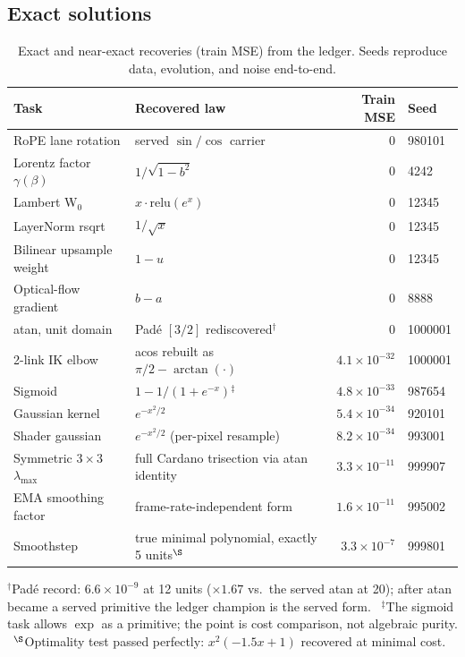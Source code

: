 \documentclass[11pt]{article}
\begin{document}
\subsection{Exact solutions}
\begin{table}[h]
\centering
\caption{Exact and near-exact recoveries (train MSE) from the ledger. Seeds reproduce data, evolution, and noise end-to-end.}
\label{tab:exact}
\small
\begin{tabular}{@{}llrl@{}}
\toprule
Task & Recovered law & Train MSE & Seed \\
\midrule
RoPE lane rotation & served $\sin/\cos$ carrier & $0$ & 980101 \\
Lorentz factor $\gamma(\beta)$ & $1/\sqrt{1-b^2}$ & $0$ & 4242 \\
Lambert W$_0$ & $x\cdot\mathrm{relu}(e^x)$ & $0$ & 12345 \\
LayerNorm rsqrt & $1/\sqrt{x}$ & $0$ & 12345 \\
Bilinear upsample weight & $1-u$ & $0$ & 12345 \\
Optical-flow gradient & $b-a$ & $0$ & 8888 \\
atan, unit domain & Pad\'e $[3/2]$ rediscovered$^{\dagger}$ & $0$ & 1000001 \\
2-link IK elbow & acos rebuilt as $\pi/2-\arctan(\cdot)$ & $4.1\times10^{-32}$ & 1000001 \\
Sigmoid & $1 - 1/(1+e^{-x})$$^{\ddagger}$ & $4.8\times10^{-33}$ & 987654 \\
Gaussian kernel & $e^{-x^2/2}$ & $5.4\times10^{-34}$ & 920101 \\
Shader gaussian & $e^{-x^2/2}$ (per-pixel resample) & $8.2\times10^{-34}$ & 993001 \\
Symmetric $3{\times}3$ $\lambda_{\max}$ & full Cardano trisection via atan identity & $3.3\times10^{-11}$ & 999907 \\
EMA smoothing factor & frame-rate-independent form & $1.6\times10^{-11}$ & 995002 \\
Smoothstep & true minimal polynomial, exactly 5 units$^{\S}$ & $3.3\times10^{-7}$ & 999801 \\
\bottomrule
\end{tabular}
\par\smallskip
\raggedright\footnotesize
$^{\dagger}$Pad\'e record: $6.6\times10^{-9}$ at 12 units ($\times1.67$ vs.\ the served atan at 20); after atan became a served primitive the ledger champion is the served form. \
$^{\ddagger}$The sigmoid task allows $\exp$ as a primitive; the point is cost comparison, not algebraic purity. \
$^{\S}$Optimality test passed perfectly: $x^2(-1.5x+1)$ recovered at minimal cost.
\end{table}
\end{document}
